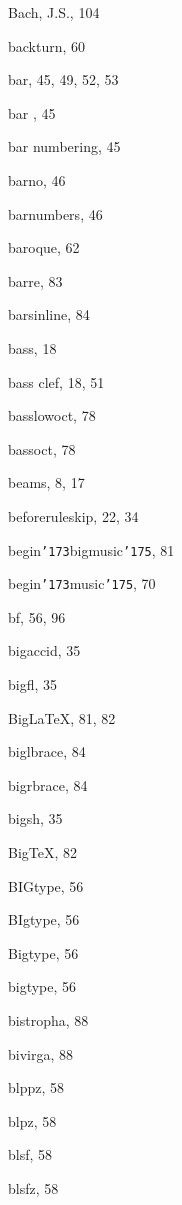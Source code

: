 \begin{theindex}
  \indexspace

  \item {\sc Bach, J.S.}, 104
  \item {\Bslash backturn}, 60
  \item {\Bslash bar}, 45, 49, 52, 53
  \item {\Bslash bar} , 45
  \item bar numbering, 45
  \item {\Bslash barno}, 46
  \item {\Bslash barnumbers}, 46
  \item baroque, 62
  \item {\Bslash barre}, 83
  \item {\Bslash barsinline}, 84
  \item {\Bslash bass}, 18
  \item bass clef, 18, 51
  \item {\Bslash basslowoct}, 78
  \item {\Bslash bassoct}, 78
  \item beams, 8, 17
  \item {\Bslash beforeruleskip}, 22, 34
  \item {\Bslash begin{\tt  \char '173}bigmusic{\tt  \char '175}}, 81
  \item {\Bslash begin{\tt  \char '173}music{\tt  \char '175}}, 70
  \item {\Bslash bf}, 56, 96
  \item {\Bslash bigaccid}, 35
  \item {\Bslash bigfl}, 35
  \item Big\LaTeX, 81, 82
  \item {\Bslash biglbrace}, 84
  \item {\Bslash bigrbrace}, 84
  \item {\Bslash bigsh}, 35
  \item Big\TeX, 82
  \item {\Bslash BIGtype}, 56
  \item {\Bslash BIgtype}, 56
  \item {\Bslash Bigtype}, 56
  \item {\Bslash bigtype}, 56
  \item {\Bslash bistropha}, 88
  \item {\Bslash bivirga}, 88
  \item {\Bslash blppz}, 58
  \item {\Bslash blpz}, 58
  \item {\Bslash blsf}, 58
  \item {\Bslash blsfz}, 58

\end{theindex}
